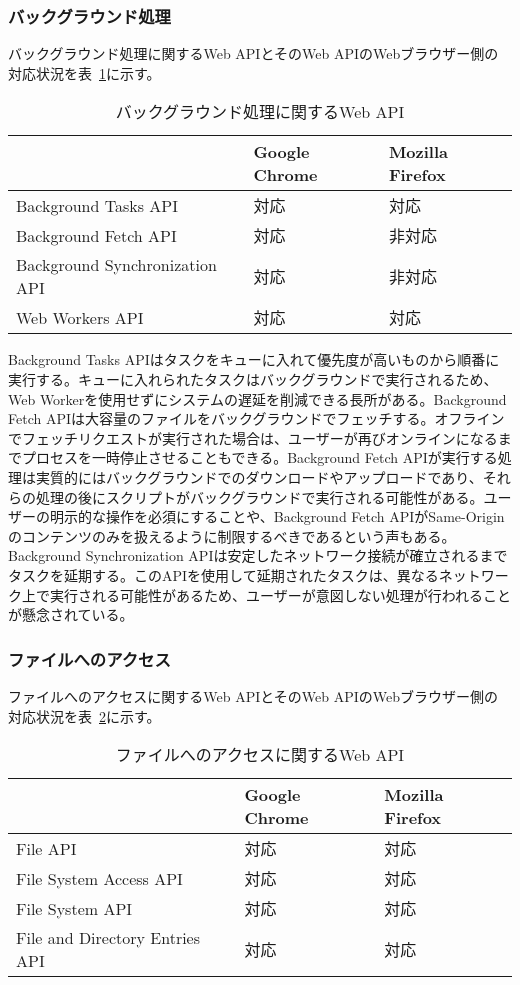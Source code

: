 \subsubsection{バックグラウンド処理}\label{subsubsection:バックグラウンド処理}
バックグラウンド処理に関するWeb APIとそのWeb APIのWebブラウザー側の対応状況を表~\ref{table:バックグラウンド処理に関するWeb API}に示す。
\begin{table}
  \centering
  \begin{tabular}{|p{20em}|p{10em}|p{10em}|}
    \hline
    & Google Chrome & Mozilla Firefox \\ \hline
    Background Tasks API & 対応 & 対応 \\ \hline
    Background Fetch API & 対応 & 非対応 \\ \hline
    Background Synchronization API & 対応 & 非対応 \\ \hline
    Web Workers API & 対応 & 対応 \\ \hline
  \end{tabular}
  \caption{バックグラウンド処理に関するWeb API}\label{table:バックグラウンド処理に関するWeb API}
\end{table}
Background Tasks APIはタスクをキューに入れて優先度が高いものから順番に実行する。キューに入れられたタスクはバックグラウンドで実行されるため、Web Workerを使用せずにシステムの遅延を削減できる長所がある。Background Fetch APIは大容量のファイルをバックグラウンドでフェッチする。オフラインでフェッチリクエストが実行された場合は、ユーザーが再びオンラインになるまでプロセスを一時停止させることもできる。Background Fetch APIが実行する処理は実質的にはバックグラウンドでのダウンロードやアップロードであり、それらの処理の後にスクリプトがバックグラウンドで実行される可能性がある。ユーザーの明示的な操作を必須にすることや、Background Fetch APIがSame-Originのコンテンツのみを扱えるように制限するべきであるという声もある。Background Synchronization APIは安定したネットワーク接続が確立されるまでタスクを延期する。このAPIを使用して延期されたタスクは、異なるネットワーク上で実行される可能性があるため、ユーザーが意図しない処理が行われることが懸念されている。

\subsubsection{ファイルへのアクセス}\label{subsubsection:ファイルへのアクセス}
ファイルへのアクセスに関するWeb APIとそのWeb APIのWebブラウザー側の対応状況を表~\ref{table:ファイルへのアクセスに関するWeb API}に示す。
\begin{table}
  \centering
  \begin{tabular}{|p{20em}|p{10em}|p{10em}|}
    \hline
    & Google Chrome & Mozilla Firefox \\ \hline
    File API & 対応 & 対応 \\ \hline
    File System Access API & 対応 & 対応 \\ \hline
    File System API & 対応 & 対応 \\ \hline
    File and Directory Entries API & 対応 & 対応 \\ \hline
  \end{tabular}
  \caption{ファイルへのアクセスに関するWeb API}\label{table:ファイルへのアクセスに関するWeb API}
\end{table}

